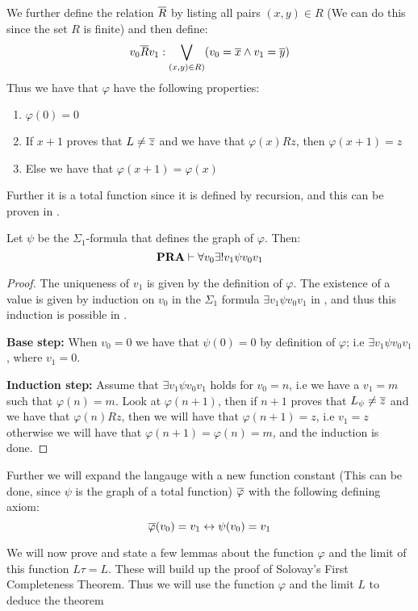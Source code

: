 \documentclass[../main.tex]{subfiles}
\begin{document}
We further define the relation $\overline R$ by listing all pairs $(x,y)\in R$ (We
can do this since the set $R$ is finite) and
then define:
\[v_0 \overline Rv_1: \bigvee_{(x,y)\in R)}(v_0=\overline x\wedge v_1=\overline y) \]
Thus we have that $\varphi$ have the following properties:
\begin{enumerate}
	\item $\varphi(0)=0$
	\item If $x+1$ proves that $L\not =\overline z$ and we have that $\varphi(x)Rz$,
		then $\varphi(x+1)=z$
	\item Else we have that $\varphi(x+1)=\varphi(x)$
\end{enumerate}
Further it is a total function
since it is defined by recursion, and this can be proven in \PRA.
\begin{prop}
	Let $\psi$ be the $\Sigma_1$-formula that defines the graph of
	$\varphi$. Then:
	\[\text{\textbf{PRA}}\vdash\forall v_0\exists !v_1\psi v_0v_1\]
\end{prop}
\begin{proof}
	The uniqueness of $v_1$ is given by the definition of $\varphi$. The
	existence of a value is given by induction on $v_0$ in the $\Sigma_1$ formula $\exists
	v_1\psi v_0v_1$ in \PRA, and thus this induction is possible in \PRA. 

	\textbf{Base step:} When $v_0=0$ we have that $\psi(0)=0$ by
	definition of $\varphi$; i.e $\exists v_1\psi v_0v_1$, where $v_1=0$.

	\textbf{Induction step:} Assume that $\exists v_1\psi v_0v_1$ holds for
	$v_0=n$, i.e we have a $v_1=m$ such that $\varphi(n)=m$. Look at
	$\varphi(n+1)$, then if $n+1$ proves that $L_\psi\not =\overline z$ and we
	have that $\varphi(n)Rz$, then we will have that $\varphi(n+1)=z$, i.e
	$v_1=z$ otherwise we will have that $\varphi(n+1)=\varphi(n)=m$, and
	the induction is done.
\end{proof}
Further we will expand the langauge with a new function constant (This can be
done, since $\psi$ is the graph of a total function) $\overline \varphi$ with the following
defining axiom:
$$\overline \varphi(v_0)=v_1\leftrightarrow\psi (v_0)=v_1$$

We will now prove and state a few lemmas about the function $\varphi$ and the
limit of this function $L\tau=L$. These will build up the proof of Solovay's
First Completeness Theorem. Thus we will use the function $\varphi$ and the
limit $L$ to deduce the theorem
\end{document}
